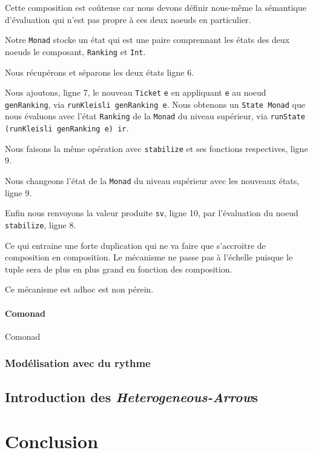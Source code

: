 \documentclass{llncs}
\newcommand{\SAs}{\emph{Heterogeneous-Arrow}s }
\begin{document}
Cette composition est coûteuse car nous devons définir nous-même la sémantique
d'évaluation qui n'est pas propre à ces deux noeuds en particulier.

Notre \lstinline{Monad} stocke un état qui est une paire comprennant les états
des deux noeuds le composant, \lstinline{Ranking} et \lstinline{Int}.

Nous récupérons et séparons les deux états ligne 6.

Nous ajoutons, ligne 7, le nouveau \lstinline{Ticket} \lstinline{e} en appliquant \lstinline{e}
au noeud \lstinline{genRanking}, via \lstinline{runKleisli genRanking e}.
Nous obtenons un \lstinline{State Monad} que nous évaluons avec l'état \lstinline{Ranking}
de la \lstinline{Monad} du niveau supérieur, via \lstinline{runState (runKleisli genRanking e) ir}.

Nous faisons la même opération avec \lstinline{stabilize} et ses fonctions respectives,
ligne 9.

Nous changeons l'état de la \lstinline{Monad} du niveau supérieur avec les nouveaux
états, ligne 9.

Enfin nous renvoyons la valeur produite \lstinline{sv}, ligne 10, par l'évaluation
du noeud \lstinline{stabilize}, ligne 8.

Ce qui entraine une forte duplication qui ne va faire que s'accroitre de
composition en composition.
Le mécanisme ne passe pas à l'échelle puisque le tuple sera de plus en plus
grand en fonction des composition.

Ce mécanisme est adhoc est non pérein.

\paragraph{Comonad}
Comonad~\cite{Brookes91}~\cite{Coutts07}

\subsubsection{Modélisation avec du rythme}

\subsection{Introduction des \SAs}

\section{Conclusion}
\end{document}
